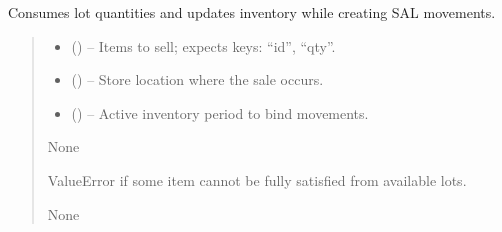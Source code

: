 \documentclass[a4paper,11pt,spanish]{sphinxmanual}
\begin{document}
\begin{fulllineitems}
\label{\detokenize{api/sale/sale.services:sale.services.consume_stock_and_register_movements}}
\pysigstartsignatures
\pysiglinewithargsret
{}
{\sphinxparamcomma {}\sphinxparamcomma {}}
{}
\pysigstopsignatures
\sphinxAtStartPar
Consumes lot quantities and updates inventory while creating SAL movements.
\begin{quote}\begin{description}
\begin{itemize}
\item {} 
\sphinxAtStartPar
{} (\sphinxstyleliteralemphasis{\sphinxupquote{{[}}}\sphinxstyleliteralemphasis{\sphinxupquote{{]}}}) – Items to sell; expects keys: “id”, “qty”.

\item {} 
\sphinxAtStartPar
{} ({\hyperref[\detokenize{api/inventory/inventory.models:inventory.models.Location}]{}}) – Store location where the sale occurs.

\item {} 
\sphinxAtStartPar
{} ({\hyperref[\detokenize{api/inventory/inventory.models:inventory.models.InventoryConfig}]{}}) – Active inventory period to bind movements.

\end{itemize}

\sphinxAtStartPar
None

\sphinxAtStartPar
ValueError if some item cannot be fully satisfied from available lots.

\sphinxAtStartPar
None

\end{description}\end{quote}

\end{fulllineitems}
\end{document}
